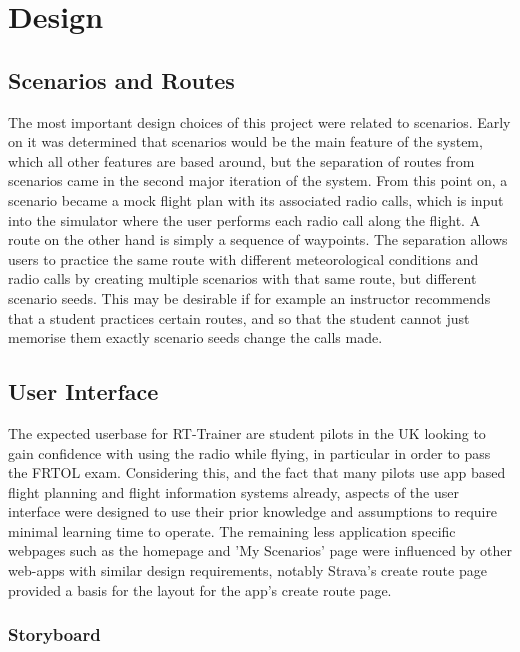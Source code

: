 \chapter{Design}
\label{ch:design}

\section{Scenarios and Routes}
The most important design choices of this project were related to scenarios. Early on it was determined that scenarios would be the main feature of the system, which all other features are based around, but the separation of routes from scenarios came in the second major iteration of the system. From this point on, a scenario became a mock flight plan with its associated radio calls, which is input into the simulator where the user performs each radio call along the flight. A route on the other hand is simply a sequence of waypoints. The separation allows users to practice the same route with different meteorological conditions and radio calls by creating multiple scenarios with that same route, but different scenario seeds. This may be desirable if for example an instructor recommends that a student practices certain routes, and so that the student cannot just memorise them exactly scenario seeds change the calls made.

\section{User Interface}

The expected userbase for RT-Trainer are student pilots in the UK looking to gain confidence with using the radio while flying, in particular in order to pass the FRTOL exam. Considering this, and the fact that many pilots use app based flight planning and flight information systems already, aspects of the user interface were designed to use their prior knowledge and assumptions to require minimal learning time to operate. The remaining less application specific webpages such as the homepage and 'My Scenarios' page were influenced by other web-apps with similar design requirements, notably Strava's create route page provided a basis for the layout for the app's create route page.

\subsection{Storyboard}

